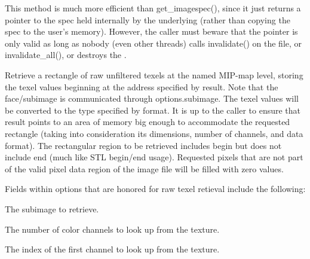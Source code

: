 This method is much more efficient than {\cf get_imagespec()}, since it
just returns a pointer to the spec held internally by the underlying \ImageCache
(rather than copying the spec to the user's memory).  However, the
caller must beware that the pointer is only valid as long as nobody
(even other threads) calls {\cf invalidate()} on the file, or {\cf
  invalidate_all()}, or destroys the \TextureSystem.
\apiend


Retrieve a rectangle of raw unfiltered texels at the named MIP-map level, storing
the texel values beginning at the address specified by result.
Note that the face/subimage is communicated through {\kw options.subimage}.
The texel values will be converted to the type specified by
format.  It is up to the caller to ensure that result points to
an area of memory big enough to accommodate the requested
rectangle (taking into consideration its dimensions, number of
channels, and data format).  The rectangular region to be
retrieved includes {\cf begin} but does not include {\cf end} (much
like STL begin/end usage).
Requested pixels that are not part of the valid pixel data region of the
image file will be filled with zero values.

Fields within {\cf options} that are honored for raw texel retieval
include the following:

\vspace{-12pt}
\vspace{10pt}
The subimage to retrieve.
\apiend

\vspace{-24pt}
\vspace{10pt}
The number of color channels to look up from the texture.
\apiend

\vspace{-24pt}
\vspace{10pt}
The index of the first channel to look up from the texture.
\apiend


